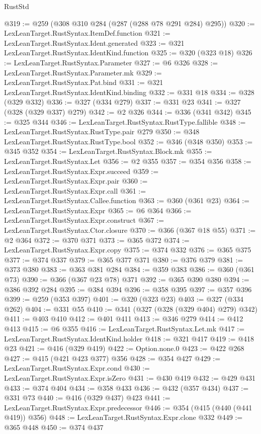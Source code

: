 \begin{lexlean}{RustStd}
\begin{coremodule}
@319 := @259 (@308 @310 @284 (@287 (@288 @78 @291 @284) @295))
@320 := LexLeanTarget.RustSyntax.ItemDef.function
@321 := LexLeanTarget.RustSyntax.Ident.generated
@323 := @321 LexLeanTarget.RustSyntax.IdentKind.function
@325 := @320 (@323 @18)
@326 := LexLeanTarget.RustSyntax.Parameter
@327 := @6 @326
@328 := LexLeanTarget.RustSyntax.Parameter.mk
@329 := LexLeanTarget.RustSyntax.Pat.bind
@331 := @321 LexLeanTarget.RustSyntax.IdentKind.binding
@332 := @331 @18
@334 := @328 (@329 @332)
@336 := @327 (@334 @279)
@337 := @331 @23
@341 := @327 (@328 (@329 @337) @279)
@342 := @2 @326
@344 := @336 (@341 @342)
@345 := @325 @344
@346 := LexLeanTarget.RustSyntax.RustType.fallible
@348 := LexLeanTarget.RustSyntax.RustType.pair @279
@350 := @348 LexLeanTarget.RustSyntax.RustType.bool
@352 := @346 (@348 @350)
@353 := @345 @352
@354 := LexLeanTarget.RustSyntax.Block.mk
@355 := LexLeanTarget.RustSyntax.Let
@356 := @2 @355
@357 := @354 @356
@358 := LexLeanTarget.RustSyntax.Expr.succeed
@359 := LexLeanTarget.RustSyntax.Expr.pair
@360 := LexLeanTarget.RustSyntax.Expr.call
@361 := LexLeanTarget.RustSyntax.Callee.function
@363 := @360 (@361 @23)
@364 := LexLeanTarget.RustSyntax.Expr
@365 := @6 @364
@366 := LexLeanTarget.RustSyntax.Expr.construct
@367 := LexLeanTarget.RustSyntax.Ctor.closure
@370 := @366 (@367 @18 @55)
@371 := @2 @364
@372 := @370 @371
@373 := @365 @372
@374 := LexLeanTarget.RustSyntax.Expr.copy
@375 := @374 @332
@376 := @365 @375
@377 := @374 @337
@379 := @365 @377 @371
@380 := @376 @379
@381 := @373 @380
@383 := @363 @381 @284
@384 := @359 @383
@386 := @360 (@361 @73)
@390 := @366 (@367 @23 @78) @371
@392 := @365 @390 @380
@394 := @386 @392 @284
@395 := @384 @394
@396 := @358 @395
@397 := @357 @396
@399 := @259 (@353 @397)
@401 := @320 (@323 @23)
@403 := @327 (@334 @262)
@404 := @331 @55
@410 := @341 (@327 (@328 (@329 @404) @279) @342)
@411 := @403 @410
@412 := @401 @411
@413 := @346 @279
@414 := @412 @413
@415 := @6 @355
@416 := LexLeanTarget.RustSyntax.Let.mk
@417 := LexLeanTarget.RustSyntax.IdentKind.holder
@418 := @321 @417
@419 := @418 @23
@421 := @416 (@329 @419)
@422 := Option.none.{0}
@423 := @422 @268
@427 := @415 (@421 @423 @377) @356
@428 := @354 @427
@429 := LexLeanTarget.RustSyntax.Expr.cond
@430 := LexLeanTarget.RustSyntax.Expr.isZero
@431 := @430 @419
@432 := @429 @431
@433 := @374 @404
@434 := @358 @433
@436 := @432 (@357 @434)
@437 := @331 @73
@440 := @416 (@329 @437) @423
@441 := LexLeanTarget.RustSyntax.Expr.predecessor
@446 := @354 (@415 (@440 (@441 @419)) @356)
@448 := LexLeanTarget.RustSyntax.Expr.clone @332
@449 := @365 @448
@450 := @374 @437

\end{coremodule}
\end{lexlean}
